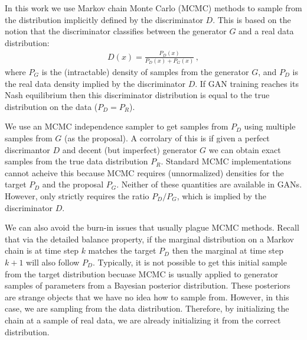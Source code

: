 \documentclass{article}
\begin{document}
In this work we use Markov chain Monte Carlo (MCMC) methods to sample from the distribution implicitly defined by the discriminator $D$.
This is based on the notion that the discriminator classifies between the generator $G$ and a real data distribution:
\begin{align}
  D(x) = \frac{P_D(x)}{P_D(x) + P_G(x)}\,,
\end{align}
where $P_G$ is the (intractable) density of samples from the generator $G$, and $P_D$ is the real data density implied by the discriminator $D$.
If GAN training reaches its Nash equilibrium then this discriminator distribution is equal to the true distribution on the data ($P_D = P_R$)\@.  %

We use an MCMC independence sampler to get samples from $P_D$ using multiple samples from $G$ (as the proposal)\@.
A corrolary of this is if given a perfect discrimantor $D$ and decent (but imperfect) generator $G$ we can obtain exact samples from the true data distribution $P_R$.
Standard MCMC implementations cannot acheive this because MCMC requires (unnormalized) densities for the target $P_D$ and the proposal $P_G$.
Neither of these quantities are available in GANs.
However, only strictly requires the ratio $P_D / P_G$, which is implied by the discriminator $D$.

We can also avoid the burn-in issues that usually plague MCMC methods.
Recall that via the detailed balance property, if the marginal distribution on a Markov chain is at time step $k$ matches the target $P_D$ then the marginal at time step $k+1$ will also follow $P_D$.
Typically, it is not possible to get this initial sample from the target distribution becuase MCMC is usually applied to generator samples of parameters from a Bayesian posterior distribution.
These posteriors are strange objects that we have no idea how to sample from.
However, in this case, we are sampling from the data distribution.
Therefore, by initializing the chain at a sample of real data, we are already initializing it from the correct distribution.
\end{document}
